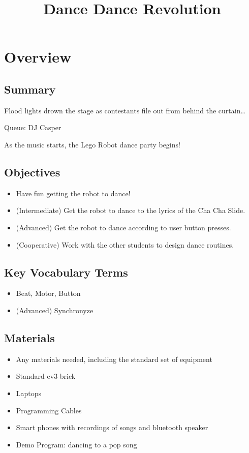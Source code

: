 \documentclass{lessonplan}
\title{Dance Dance Revolution}
\author{\linkHome}
\date{}
\begin{document}
  \maketitle

  \section{Overview}
    \subsection{Summary}
      Flood lights drown the stage as contestants file out from behind
      the curtain\ldots

      Queue: DJ Casper

      As the music starts, the Lego Robot dance party begins!

    \subsection{Objectives}
    \begin{itemize}
      \item Have fun getting the robot to dance!
      \item (Intermediate) Get the robot to dance to the lyrics of the
        Cha Cha Slide.
      \item (Advanced) Get the robot to dance according to user button
        presses.
      \item (Cooperative) Work with the other students to design dance routines.

    \end{itemize}
    \subsection{Key Vocabulary Terms}
    \begin{itemize}
      \item Beat, Motor, Button
      \item (Advanced) Synchronyze
    \end{itemize}
    \subsection{Materials}
      \begin{itemize}
        \item Any materials needed, including the standard set of
          equipment
        \item Standard ev3 brick
        \item Laptops
        \item Programming Cables
        \item Smart phones with recordings of songs and bluetooth speaker
        \item Demo Program: dancing to a pop song

      \end{itemize}
\end{document}
